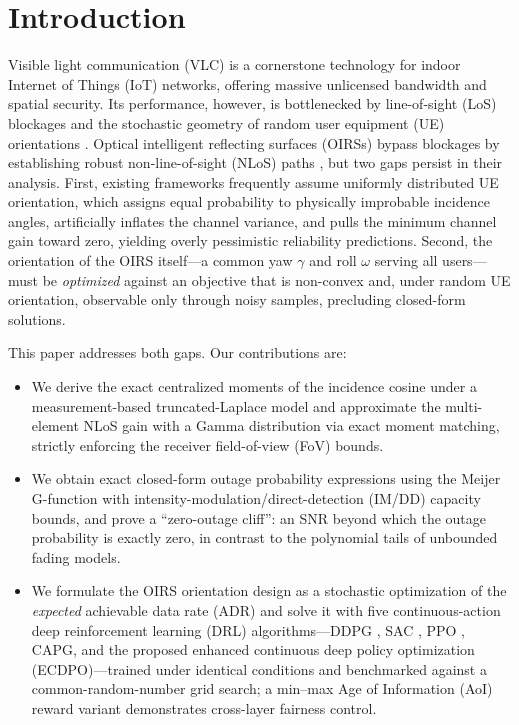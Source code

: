\documentclass[conference]{IEEEtran}
\begin{document}
\section{Introduction}
Visible light communication (VLC) is a cornerstone technology for indoor
Internet of Things (IoT) networks, offering massive unlicensed bandwidth and
spatial security. Its performance, however, is bottlenecked by line-of-sight
(LoS) blockages and the stochastic geometry of random user equipment (UE)
orientations \cite{eroglu2018}. Optical intelligent reflecting surfaces
(OIRSs) bypass blockages by establishing robust non-line-of-sight (NLoS)
paths \cite{aboagye2023}, but two gaps persist in their analysis. First,
existing frameworks frequently assume uniformly distributed UE orientation,
which assigns equal probability to physically improbable incidence angles,
artificially inflates the channel variance, and pulls the minimum channel
gain toward zero, yielding overly pessimistic reliability predictions.
Second, the orientation of the OIRS itself---a common yaw $\gamma$ and roll
$\omega$ serving all users---must be \emph{optimized} against an objective
that is non-convex and, under random UE orientation, observable only through
noisy samples, precluding closed-form solutions.

This paper addresses both gaps. Our contributions are:
\begin{itemize}
\item We derive the exact centralized moments of the incidence cosine under a
measurement-based truncated-Laplace model \cite{soltani2018} and approximate
the multi-element NLoS gain with a Gamma distribution via exact moment
matching, strictly enforcing the receiver field-of-view (FoV) bounds.
\item We obtain exact closed-form outage probability expressions using the
Meijer G-function with intensity-modulation/direct-detection (IM/DD) capacity
bounds, and prove a ``zero-outage cliff'': an SNR beyond which the outage
probability is exactly zero, in contrast to the polynomial tails of
unbounded fading models.
\item We formulate the OIRS orientation design as a stochastic optimization
of the \emph{expected} achievable data rate (ADR) and solve it with five
continuous-action deep reinforcement learning (DRL) algorithms---DDPG
\cite{lillicrap2016}, SAC \cite{haarnoja2018}, PPO \cite{schulman2017}, CAPG,
and the proposed enhanced continuous deep policy optimization
(ECDPO)---trained under identical conditions and benchmarked against a
common-random-number grid search; a min--max Age of Information (AoI) reward
variant demonstrates cross-layer fairness control.
\end{itemize}
\end{document}
